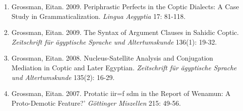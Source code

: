 \documentclass[letterpaper,11pt]{article}
\begin{document}
\begin{enumerate}[resume]
\item {Grossman, Eitan.} {2009.} Periphrastic Perfects in the Coptic Dialects: A Case Study in Grammaticalization. \textit{Lingua Aegyptia} 17: 81-118.

\item {Grossman, Eitan.} {2009.} The Syntax of Argument Clauses in Sahidic Coptic. \textit{Zeitschrift f\"ur \"agyptische Sprache und Altertumskunde} 136(1): 19-32.

\item {Grossman, Eitan.} {2008.} Nucleus-Satellite Analysis and Conjugation Mediation in Coptic and Later Egyptian. \textit{Zeitschrift f\"ur \"agyptische Sprache und Altertumskunde} 135(2): 16-29. 

\item {Grossman, Eitan.} {2007.} Protatic iir=f sdm in the Report of Wenamun: A Proto-Demotic Feature?’ \textit{G\"ottinger Miszellen} 215: 49-56. 
\end{enumerate}
\end{document}
